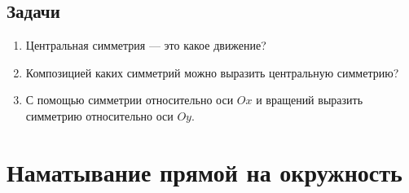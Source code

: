 \subsection{Задачи}
\begin{enumerate}
\item Центральная симметрия --- это какое движение?
\item Композицией каких симметрий можно выразить центральную симметрию?
\item С помощью симметрии относительно оси $Ox$ и вращений выразить симметрию относительно оси $Oy$.
\end{enumerate}


\section{Наматывание прямой на окружность}

